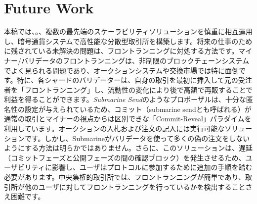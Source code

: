 \section{Future Work}
本稿では、。、複数の最先端のスケーラビリティソリューションを慎重に相互運用し、暗号通貨システムで高性能な分散型取引所を構築します。将来の仕事のために残されている未解決の問題は、フロントランニングに対処する方法です。マイナー/バリデータのフロントランニングは、非制限のブロックチェーンシステムでよく見られる問題であり、オークションシステムや交換市場では特に面倒です。特に、各シャードのバリデーターは、自身の取引を最初に挿入して元の受注者を「フロントランニング」し、流動性の変化により後で高額で再販することで利益を得ることができます。\textit{Submarine Send}\cite{submarine}のようなプロポーザルは、十分な匿名性の設定が与えられているため、コミット（submarine sendとも呼ばれる）が通常の取引とマイナーの視点からは区別できな「Commit-Reveal」パラダイムを利用しています。オークションの入札および注文の記入には実行可能なソリューションです。しかし、Submarineがバリデータを使って多くの偽の注文をしないようにする方法は明らかではありません。さらに、このソリューションは、遅延（コミットフェーズと公開フェーズの間の確認ブロック）を発生させるため、ユーザビリティに影響し、ユーザはプロトコルに参加するために追加の手順を踏む必要があります。中央集権的取引所では、フロントランニングが簡単であり、取引所が他のユーザに対してフロントランニングを行っているかを検出することさえ困難です。
